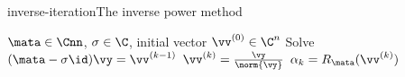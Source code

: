 \begin{Algorithm*}{inverse-iteration}{The inverse power method}
    \begin{algorithmic}[1]
    \Require $\mata\in\Cnn$, $\sigma\in\C$, initial vector $\vv^{(0)}\in\C^n$
    \State Solve $(\mata-\sigma\id) \vy = \vv^{(k-1)}$
    \State $\vv^{(k)} = \frac{\vy}{\norm{\vy}}$
    \State $\alpha_k = R_\mata(\vv^{(k)})$
    \EndFor
  \end{algorithmic}
\end{Algorithm*}
